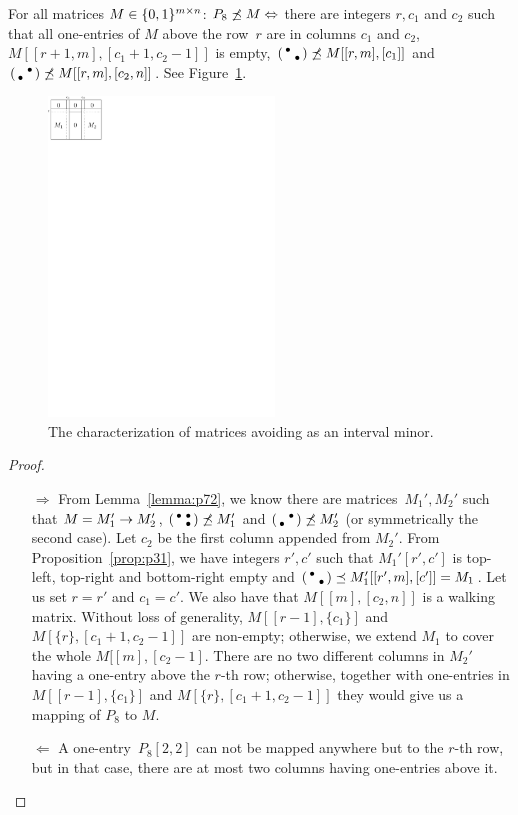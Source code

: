 \begin{prop}
\label{prop:p72}
For all matrices $M\in\{0,1\}^{m\times n}$: $P_8\not\preceq M\Leftrightarrow$ there are integers $r,c_1$ and $c_2$ such that all one-entries of $M$ above the row~$r$ are in columns $c_1$ and $c_2$, $M[[r+1,m],[c_1+1,c_2-1]]$ is empty, $\left(\begin{smallmatrix}\bullet& \\ &\bullet\end{smallmatrix}\right)\not\preceq M[[r,m],[c_1]]$ and $\left(\begin{smallmatrix} &\bullet\\\bullet& \end{smallmatrix}\right)\not\preceq M[[r,m],[c_2,n]]$. See Figure~\ref{fig:p72}.
\end{prop}
\begin{figure}[!ht]
\centering
\includegraphics[width=60mm]{img/p72.pdf}
\caption{The characterization of matrices avoiding \usebox{\smlmatc} as an interval minor.}
\label{fig:p72}
\end{figure}
\begin{proof}
\begin{itemize}
	\item[$\Rightarrow$] From Lemma~\ref{lemma:p72}, we know there are matrices~$M_1',M_2'$ such that $M=M_1'\rightarrow M_2'$, $\left(\begin{smallmatrix}\bullet&\bullet\\ &\bullet\end{smallmatrix}\right)\not\preceq M_1'$ and $\left(\begin{smallmatrix} &\bullet\\\bullet& \end{smallmatrix}\right)\not\preceq M_2'$ (or symmetrically the second case). Let $c_2$ be the first column appended from $M_2'$. From Proposition~\ref{prop:p31}, we have integers $r',c'$ such that $M_1'[r',c']$ is top-left, top-right and bottom-right empty and $\left(\begin{smallmatrix}\bullet& \\ &\bullet\end{smallmatrix}\right)\preceq M_1'[[r',m],[c']]=M_1$. Let us set $r=r'$ and $c_1=c'$. We also have that $M[[m],[c_2,n]]$ is a walking matrix. Without loss of generality, $M[[r-1],\{c_1\}]$ and $M[\{r\},[c_1+1,c_2-1]]$ are non-empty; otherwise, we extend $M_1$ to cover the whole $M[[m],[c_2-1]$. There are no two different columns in $M_2'$ having a one-entry above the $r$-th row; otherwise, together with one-entries in $M[[r-1],\{c_1\}]$ and $M[\{r\},[c_1+1,c_2-1]]$ they would give us a mapping of $P_8$ to $M$.
	\item[$\Leftarrow$] A one-entry~$P_8[2,2]$ can not be mapped anywhere but to the $r$-th row, but in that case, there are at most two columns having one-entries above it. \qedhere
\end{itemize}
\end{proof}

